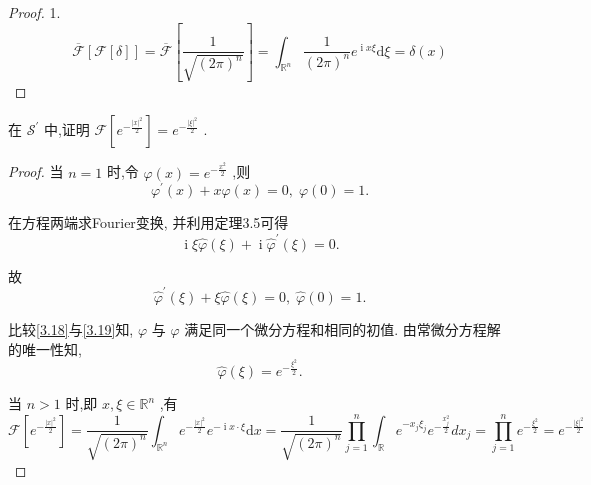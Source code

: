 \documentclass[lang=cn,newtx,10pt,scheme=chinese,thmcnt=chapter]{elegantbook}
\newcommand{\dif}{\mathrm{d}}
\newcommand{\ci}{\operatorname{i}}
\begin{document}
\begin{proof}
1.\[
\overline{\mathcal{F}}\left\lbrack \mathcal{F}\left\lbrack \delta\right\rbrack \right\rbrack =\overline{\mathcal{F}}\left\lbrack  \frac{1}{\sqrt{(2\pi)^n}}\right\rbrack  =\int_{\mathbb{R}^n}\frac{1}{(2\pi)^n}e^{\ci x\xi}\dif \xi=\delta(x)
\]

    
\end{proof}
 \begin{example}
   在 \({\mathcal{S}}^{\prime }\) 中,证明 \(\mathcal{F}\left\lbrack  {e}^{-\frac{{\left| x\right| }^{2}}{2}}\right\rbrack   = {e}^{-\frac{{\left| \xi \right| }^{2}}{2}}\) .
  
\end{example}
 \begin{proof}
  当 \(n = 1\) 时,令 \(\varphi \left( x\right)  = {e}^{-\frac{{x}^{2}}{2}}\) ,则  \begin{equation}
  {\varphi }^{\prime }\left( x\right)  + {x\varphi }\left( x\right)  = 0,\;\varphi \left( 0\right)  = 1. \label{3.18}
  \end{equation}
  
  在方程两端求Fourier变换, 并利用定理3.5可得\begin{equation*}
  {\ci\xi }\widehat{\varphi }\left( \xi \right)  + \ci{\widehat{\varphi }}^{\prime }\left( \xi \right)  = 0.
  \end{equation*}
  
  故\begin{equation}
  {\widehat{\varphi }}^{\prime }\left( \xi \right)  + \xi \widehat{\varphi }\left( \xi \right)  = 0,\;\widehat{\varphi }\left( 0\right)  = 1. \label{3.19}
  \end{equation}
  
  比较\ref{3.18}与\ref{3.19}知, \(\varphi\) 与 \(\widehat{\varphi }\) 满足同一个微分方程和相同的初值. 由常微分方程解的唯一性知,  \begin{equation*}
  \widehat{\varphi }\left( \xi \right)  = {e}^{-\frac{{\xi }^{2}}{2}}.
  \end{equation*}
  
  当 \(n > 1\) 时,即 \(x,\xi  \in  {\mathbb{R}}^{n}\) ,有
\begin{equation*}
  \mathcal{F}\left\lbrack  {e}^{-\frac{{\left| x\right| }^{2}}{2}}\right\rbrack   = \frac{1}{\sqrt{{\left( 2\pi \right) }^{n}}}{\int }_{{\mathbb{R}}^{n}}{e}^{-\frac{{\left| x\right| }^{2}}{2}}{e}^{-{\ci x} \cdot  \xi }{\dif x} = \frac{1}{\sqrt{{\left( 2\pi \right) }^{n}}}\mathop{\prod }\limits_{{j = 1}}^{n}{\int }_{\mathbb{R}}{e}^{-{x}_{j}{\xi }_{j}}{e}^{-\frac{{x}_{j}^{2}}{2}}d{x}_{j}
  = \mathop{\prod }\limits_{{j = 1}}^{n}{e}^{-\frac{{\xi }^{2}}{2}} = {e}^{-\frac{{\left| \xi \right| }^{2}}{2}}
  \end{equation*}
  
\end{proof}
\end{document}
